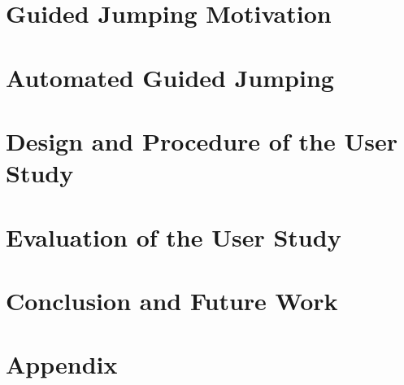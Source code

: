 
\chapter{Guided Jumping Motivation}



\chapter{Automated Guided Jumping}



%


\chapter{Design and Procedure of the User Study}



%


\chapter{Evaluation of the User Study}



\chapter{Conclusion and Future Work}



{\footnotesize
{}

}


\appendix
\chapter{Appendix}



